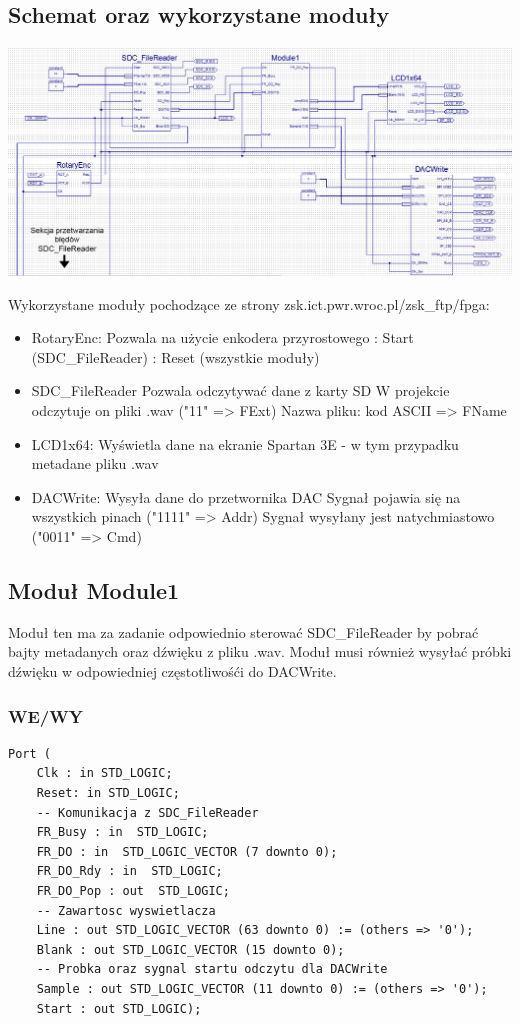 \documentclass{article}
\begin{document}
\subsection{Schemat oraz wykorzystane moduły}
\begin{center}
	\includegraphics[scale=0.5, center]{photo/sch_horizontal.png}
\end{center}
\par Wykorzystane moduły pochodzące ze strony zsk.ict.pwr.wroc.pl/zsk\_ftp/fpga:
\begin{itemize}
	\item{RotaryEnc}: Pozwala na użycie enkodera przyrostowego
		: Start (SDC\_FileReader)
		: Reset (wszystkie moduły)
	\item{SDC\_FileReader} Pozwala odczytywać dane z karty SD
		\subitem W projekcie odczytuje on pliki .wav ("11" => FExt)
		\subitem Nazwa pliku: kod ASCII => FName
	\item{LCD1x64}: Wyświetla dane na ekranie Spartan 3E - w tym przypadku metadane pliku .wav
	\item{DACWrite}: Wysyła dane do przetwornika DAC
		\subitem Sygnał pojawia się na wszystkich pinach ("1111" => Addr)
		\subitem Sygnał wysyłany jest natychmiastowo ("0011" => Cmd)
\end{itemize}

\newpage
\subsection{Moduł Module1}
\par Moduł ten ma za zadanie odpowiednio sterować SDC\_FileReader by pobrać bajty metadanych oraz dźwięku z pliku .wav. Moduł musi również wysyłać próbki dźwięku w odpowiedniej częstotliwośći do DACWrite.
\subsubsection{WE/WY}
\begin{lstlisting}[basicstyle=\small]
Port ( 
	Clk : in STD_LOGIC;
	Reset: in STD_LOGIC;
	-- Komunikacja z SDC_FileReader
	FR_Busy : in  STD_LOGIC;
	FR_DO : in  STD_LOGIC_VECTOR (7 downto 0);
	FR_DO_Rdy : in  STD_LOGIC;
	FR_DO_Pop : out  STD_LOGIC;
	-- Zawartosc wyswietlacza 
	Line : out STD_LOGIC_VECTOR (63 downto 0) := (others => '0');
	Blank : out STD_LOGIC_VECTOR (15 downto 0);
	-- Probka oraz sygnal startu odczytu dla DACWrite
	Sample : out STD_LOGIC_VECTOR (11 downto 0) := (others => '0');
	Start : out STD_LOGIC);
\end{lstlisting}
\end{document}

